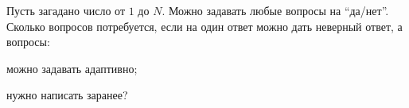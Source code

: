 Пусть загадано число от $1$ до $N$. Можно задавать любые вопросы на ``да/нет''. Сколько вопросов
потребуется, если на один ответ можно дать неверный ответ, а вопросы:
\begin{enumcyr}
    \item можно задавать адаптивно;
    \item нужно написать заранее?
\end{enumcyr}
